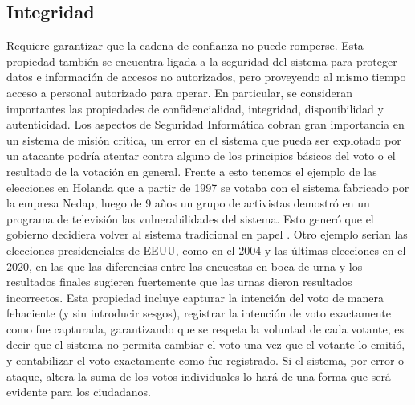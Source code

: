 \subsection{Integridad}
Requiere garantizar que la cadena de confianza no puede romperse. Esta propiedad también se encuentra ligada a la seguridad del sistema para proteger datos e información de accesos no autorizados, pero proveyendo al mismo tiempo acceso a personal autorizado para operar. En particular, se consideran importantes las propiedades de confidencialidad, integridad, disponibilidad y autenticidad. Los aspectos de Seguridad Informática cobran gran importancia en un sistema de misión crítica, un error en el sistema que pueda ser explotado por un atacante podría atentar contra alguno de los principios básicos del voto o el resultado de la votación en general. Frente a esto tenemos el ejemplo de las elecciones en Holanda que a partir de 1997 se votaba con el sistema fabricado por la empresa Nedap, luego de 9 años un grupo de activistas demostró en un programa de televisión las vulnerabilidades del sistema. Esto generó que el gobierno decidiera volver al sistema tradicional en papel \cite{eleccionesHolanda}. 
Otro ejemplo serian las elecciones presidenciales de EEUU, como en el 2004 y las últimas elecciones en el 2020, en las que las diferencias entre las encuestas en boca de urna y los resultados finales sugieren fuertemente que las urnas dieron resultados incorrectos.\newline
Esta propiedad incluye capturar la intención del voto de manera fehaciente (y sin introducir sesgos), registrar la intención de voto exactamente como fue capturada, garantizando que se respeta la voluntad de cada votante, es decir que el sistema no permita cambiar el voto una vez que el votante lo emitió, y contabilizar el voto exactamente como fue registrado. Si el sistema, por error o ataque, altera la suma de los votos individuales lo hará de una forma que será evidente para los ciudadanos.

